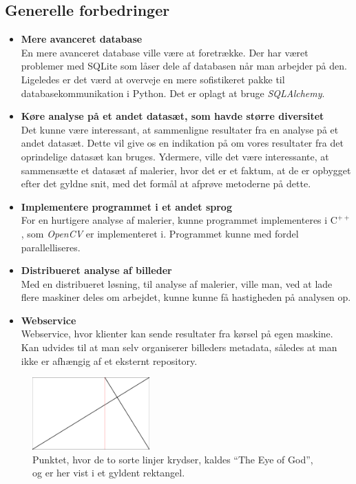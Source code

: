 {\subsection{Generelle forbedringer}
\begin{itemize}
    \item \textbf{Mere avanceret database}\\
        En mere avanceret database ville være at foretrække. Der har
        været problemer med SQLite som låser dele af databasen når man
        arbejder på den. Ligeledes er det værd at overveje en mere
        sofistikeret pakke til databasekommunikation i Python. Det er
        oplagt at bruge \emph{SQLAlchemy}\cite{SQLAlchemy}.
    \item \textbf{Køre analyse på et andet datasæt, som havde større diversitet}\\
        Det kunne være interessant, at sammenligne resultater fra en
        analyse på et andet datasæt. Dette vil give os en indikation på
        om vores resultater fra det oprindelige datasæt kan bruges.
        Ydermere, ville det være interessante, at sammensætte et datasæt
        af malerier, hvor det er et faktum, at de er opbygget efter det
        gyldne snit, med det formål at afprøve metoderne på dette.
    \item \textbf{Implementere programmet i et andet sprog}\\
        For en hurtigere analyse af malerier, kunne programmet
        implementeres i $\textrm{C}^{++}$, som \emph{OpenCV} er
        implementeret i. Programmet kunne med fordel parallelliseres.
    \item \textbf{Distribueret analyse af billeder}\\
        Med en distribueret løsning, til analyse af malerier, ville man,
        ved at lade flere maskiner deles om arbejdet, kunne kunne få
        hastigheden på analysen op.
    \item \textbf{Webservice}\\
        Webservice, hvor klienter kan sende resultater fra kørsel på
        egen maskine. Kan udvides til at man selv organiserer billeders
        metadata, således at man ikke er afhængig af et eksternt
        repository.
\end{itemize}

\begin{figure}[!h]
    \centering
    \includegraphics[angle=0,width=0.4\textwidth]{afsnit/fremtidigt_arbejde/billeder/eye_of_god}
    \caption[]{Punktet, hvor de to sorte linjer krydser, kaldes ``The Eye
    of God'', og er her vist i et gyldent rektangel.}
    \label{eye_of_god}
\end{figure}

}
